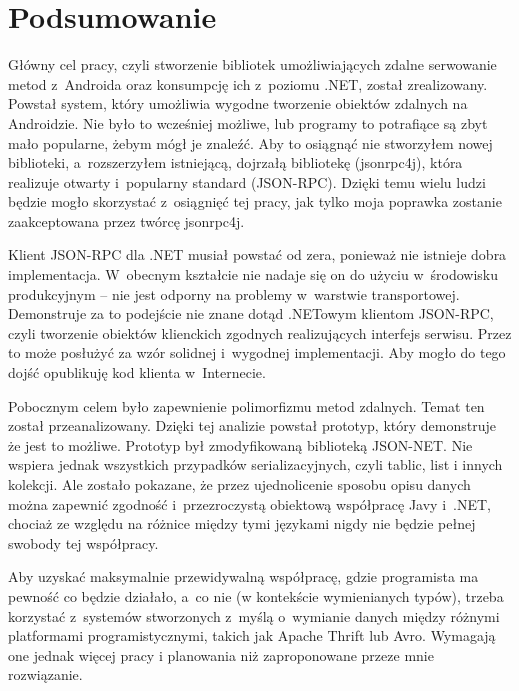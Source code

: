 \chapter{Podsumowanie}
Główny cel pracy, czyli stworzenie bibliotek umożliwiających zdalne serwowanie metod z~Androida oraz konsumpcję ich z~poziomu .NET, został zrealizowany.
Powstał system, który umożliwia wygodne tworzenie obiektów zdalnych na Androidzie. Nie było to wcześniej możliwe, lub programy to potrafiące są zbyt mało popularne, żebym mógł je znaleźć.
Aby to osiągnąć nie stworzyłem nowej biblioteki, a~rozszerzyłem istniejącą, dojrzałą bibliotekę (jsonrpc4j), która realizuje otwarty i~popularny standard (JSON-RPC).
Dzięki temu wielu ludzi będzie mogło skorzystać z~osiągnięć tej pracy, jak tylko moja poprawka zostanie zaakceptowana przez twórcę jsonrpc4j.

Klient JSON-RPC dla .NET musiał powstać od zera, ponieważ nie istnieje dobra implementacja.
W~obecnym kształcie nie nadaje się on do użyciu w~środowisku produkcyjnym -- nie jest odporny na problemy w~warstwie transportowej.
Demonstruje za to podejście nie znane dotąd .NETowym klientom JSON-RPC, czyli tworzenie obiektów klienckich zgodnych realizujących interfejs serwisu.
Przez to może posłużyć za wzór solidnej i~wygodnej implementacji.
Aby mogło do tego dojść opublikuję kod klienta w~Internecie.

Pobocznym celem było zapewnienie polimorfizmu metod zdalnych.
Temat ten został przeanalizowany. Dzięki tej analizie powstał prototyp, który demonstruje że jest to możliwe. Prototyp był zmodyfikowaną biblioteką JSON-NET.
Nie wspiera jednak wszystkich przypadków serializacyjnych, czyli tablic, list i innych kolekcji.
Ale zostało pokazane, że przez ujednolicenie sposobu opisu danych można zapewnić zgodność i~przezroczystą obiektową współpracę Javy i~.NET, chociaż ze względu na różnice między tymi językami nigdy nie będzie pełnej swobody tej współpracy.

Aby uzyskać maksymalnie przewidywalną współpracę, gdzie programista ma pewność co będzie działało, a~co nie (w kontekście wymienianych typów), trzeba korzystać z~systemów stworzonych z~myślą o~wymianie danych między różnymi platformami programistycznymi, takich jak Apache Thrift lub Avro.
Wymagają one jednak więcej pracy i planowania niż zaproponowane przeze mnie rozwiązanie.


